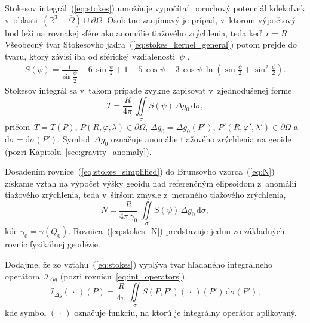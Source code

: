 \documentclass[a4paper, 12pt]{book}
\newcommand{\diff}{\mathrm d}
\begin{document}
Stokesov integrál~(\ref{eq:stokes}) umožňuje vypočítať poruchový potenciál 
kdekoľvek v~oblasti~$\left( \mathbb{R}^3 - \overline\Omega\right) \cup 
\partial\Omega$.  Osobitne zaujímavý je prípad, v~ktorom výpočtový bod leží na 
rovnakej sfére ako anomálie tiažového zrýchlenia, teda keď~$r = R$.  Všeobecný 
tvar Stokesovho jadra~(\ref{eq:stokes_kernel_general}) potom prejde do tvaru, 
ktorý závisí iba od sférickej vzdialenosti~$\psi$ 
\parencite{MoritzPhysicalGeodesy},
%
\begin{equation}
\label{eq:stokes_kernel}
\begin{split}
S(\psi) = \frac{1}{\sin\dfrac{\psi}{2}} - 6 \, \sin\frac{\psi}{2} + 1 - 5 \, 
\cos\psi - 3 \, \cos\psi \, \ln\left( \sin\frac{\psi}{2} + \sin^2\frac{\psi}{2} 
\right){.}
\end{split}
\end{equation}
%
Stokesov integrál sa v~takom prípade zvykne zapisovať v~zjednodušenej forme
%
\begin{equation}
\label{eq:stokes_simplified}
T = \frac{R}{4\pi} \, \iint\limits_{\sigma} S(\psi) \, \Delta g_0 \, \diff 
\sigma{,}
\end{equation}
%
pričom~$T = T(P)$, $P(R, \varphi, \lambda) \in \partial\Omega$, $\Delta g_0 
= \Delta g_0(P')$, $P'(R, \varphi', \lambda') \in \partial\Omega$ 
a~$\diff\sigma = \diff\sigma(P')$.  Symbol~$\Delta g_0$ označuje anomálie 
tiažového zrýchlenia na geoide (pozri Kapitolu~\ref{sec:gravity_anomaly}).

Dosadením rovnice~(\ref{eq:stokes_simplified}) do Brunsovho vzorca~(\ref{eq:N}) 
získame vzťah na výpočet výšky geoidu nad referenčným elipsoidom z~anomálií 
tiažového zrýchlenia, teda v~širšom zmysle z~meraného tiažového zrýchlenia,
%
\begin{equation}
\label{eq:stokes_N}
N = \frac{R}{4\pi \, \gamma_0} \, \iint\limits_{\sigma} S(\psi) \, \Delta g_0 
\, \diff \sigma{,}
\end{equation}
%
kde $\gamma_0 = \gamma(Q_0)$.  Rovnica~(\ref{eq:stokes_N}) predstavuje jednu zo 
základných rovníc fyzikálnej geodézie.

Dodajme, že zo vzťahu~(\ref{eq:stokes}) vyplýva tvar hľadaného integrálneho 
operátora~$\mathcal{I}_{\Delta g}$ (pozri rovnicu~\ref{eq:int_operators}),
%
\begin{equation}
\label{eq:iDg}
\mathcal{I}_{\Delta g}( \, \cdot \, )(P) = \frac{R}{4\pi} \, 
\iint\limits_\sigma S(P, P') ( \, \cdot \, )(P') \, \diff\sigma(P'){,}
\end{equation}
%
kde symbol $(\, \cdot \,)$ označuje funkciu, na ktorú je integrálny operátor 
aplikovaný.
\end{document}
